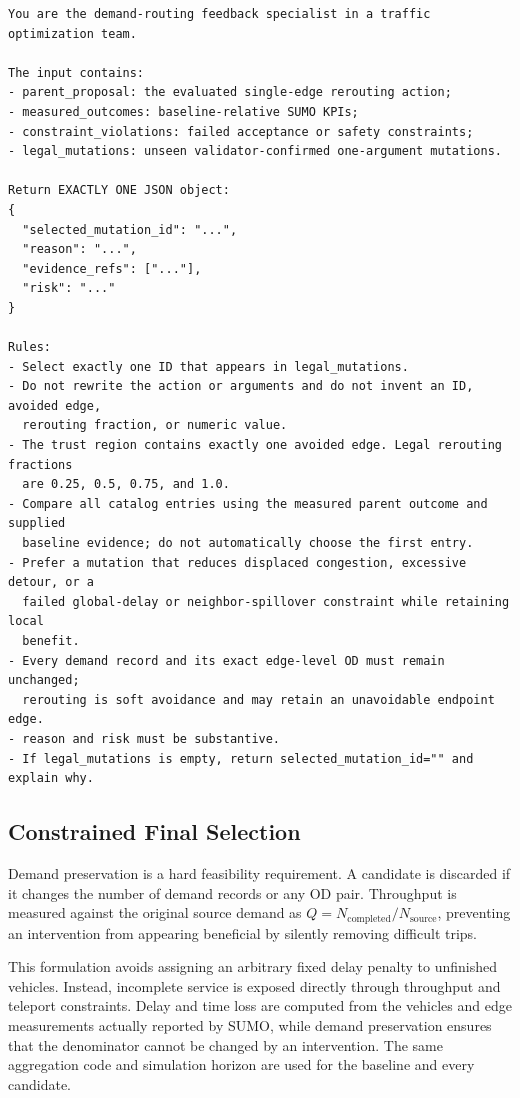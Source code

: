 \documentclass{trbunofficial}
\begin{document}
\begin{lstlisting}[style=llmprompt]
You are the demand-routing feedback specialist in a traffic optimization team.

The input contains:
- parent_proposal: the evaluated single-edge rerouting action;
- measured_outcomes: baseline-relative SUMO KPIs;
- constraint_violations: failed acceptance or safety constraints;
- legal_mutations: unseen validator-confirmed one-argument mutations.

Return EXACTLY ONE JSON object:
{
  "selected_mutation_id": "...",
  "reason": "...",
  "evidence_refs": ["..."],
  "risk": "..."
}

Rules:
- Select exactly one ID that appears in legal_mutations.
- Do not rewrite the action or arguments and do not invent an ID, avoided edge,
  rerouting fraction, or numeric value.
- The trust region contains exactly one avoided edge. Legal rerouting fractions
  are 0.25, 0.5, 0.75, and 1.0.
- Compare all catalog entries using the measured parent outcome and supplied
  baseline evidence; do not automatically choose the first entry.
- Prefer a mutation that reduces displaced congestion, excessive detour, or a
  failed global-delay or neighbor-spillover constraint while retaining local
  benefit.
- Every demand record and its exact edge-level OD must remain unchanged;
  rerouting is soft avoidance and may retain an unavoidable endpoint edge.
- reason and risk must be substantive.
- If legal_mutations is empty, return selected_mutation_id="" and explain why.
\end{lstlisting}

\subsection{Constrained Final Selection}
\label{sec:constrained-selection}

Demand preservation is a hard feasibility requirement.  A candidate is
discarded if it changes the number of demand records or any OD pair.  Throughput
is measured against the original source demand as
$Q=N_{\mathrm{completed}}/N_{\mathrm{source}}$, preventing an intervention from
appearing beneficial by silently removing difficult trips.

This formulation avoids assigning an arbitrary fixed delay penalty to
unfinished vehicles.  Instead, incomplete service is exposed directly through
throughput and teleport constraints.  Delay and time
loss are computed from the vehicles and edge measurements actually reported by
SUMO, while demand preservation ensures that the denominator cannot be changed
by an intervention.  The same aggregation code and simulation horizon are used
for the baseline and every candidate.
\end{document}
